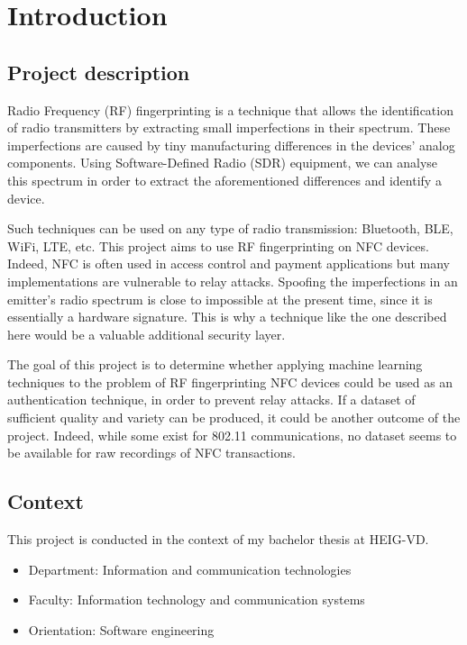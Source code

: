 \section{Introduction}

\subsection{Project description}
Radio Frequency (RF) fingerprinting is a technique that allows the identification of radio transmitters by extracting small imperfections in their spectrum. These imperfections are caused by tiny manufacturing differences in the devices' analog components. Using Software-Defined Radio (SDR) equipment, we can analyse this spectrum in order to extract the aforementioned differences and identify a device.

Such techniques can be used on any type of radio transmission: Bluetooth, BLE, WiFi, LTE, etc. This project aims to use RF fingerprinting on NFC devices. Indeed, NFC is often used in access control and payment applications but many implementations are vulnerable to relay attacks. Spoofing the imperfections in an emitter's radio spectrum is close to impossible at the present time, since it is essentially a hardware signature. This is why a technique like the one described here would be a valuable additional security layer.

The goal of this project is to determine whether applying machine learning techniques to the problem of RF fingerprinting NFC devices could be used as an authentication technique, in order to prevent relay attacks. If a dataset of sufficient quality and variety can be produced, it could be another outcome of the project. Indeed, while some exist for 802.11 communications, no dataset seems to be available for raw recordings of NFC transactions.

\subsection{Context}
This project is conducted in the context of my bachelor thesis at HEIG-VD.

\begin{itemize}
  \item Department: Information and communication technologies
  \item Faculty: Information technology and communication systems
  \item Orientation: Software engineering
\end{itemize}

